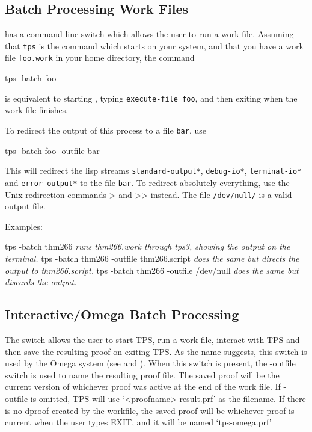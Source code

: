 \subsection{Batch Processing Work Files}

{\TPS} has a command line switch  which allows the user to run a work file.
Assuming that {\tt tps} is the command which starts {\TPS} on your system, and that you have a work
file {\tt foo.work} in your home directory, the command
\begin{tpsexample}
tps -batch foo
\end{tpsexample}
is equivalent to starting {\TPS}, typing {\tt execute-file foo}, and then exiting {\TPS} when the work file finishes.

To redirect the output of this process to a file {\tt bar}, use
\begin{tpsexample}
tps -batch foo -outfile bar
\end{tpsexample}
This will redirect the lisp streams {\tt *standard-output*}, {\tt *debug-io*}, {\tt *terminal-io*} and {\tt *error-output*}
to the file {\tt bar}. To redirect absolutely everything, use the Unix redirection commands > and >> instead. The file
{\tt /dev/null/} is a valid output file.

Examples:
\begin{tpsexample}
tps -batch thm266
{\it runs thm266.work through tps3, showing the output on the terminal.}
tps -batch thm266 -outfile thm266.script
{\it does the same but directs the output to thm266.script.}
tps -batch thm266 -outfile /dev/null
{\it does the same but discards the output.}
\end{tpsexample}

\subsection{Interactive/Omega Batch Processing}

The  switch allows the user to start TPS, run a work file, interact with TPS and then save the
resulting proof on exiting TPS. As the name suggests, this switch is used by the Omega system
(see \cite{Benzmuller97} and \cite{Benzmuller98b}).
When this switch is present, the -outfile switch is used to name the resulting proof file.
The saved proof will be the current version of whichever proof was active at the end of the work file.
If -outfile is omitted, TPS will use `<proofname>-result.prf' as the filename.
If there is no dproof created by the workfile, the saved proof will be
whichever proof is current when the user types EXIT, and it will be named
`tps-omega.prf'


